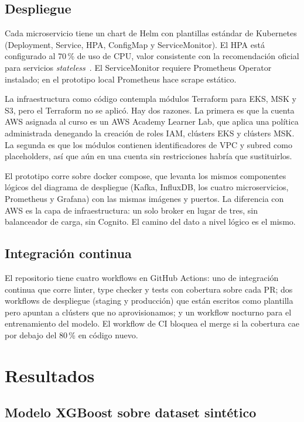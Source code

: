 \documentclass[conference]{IEEEtran}
\begin{document}
\subsection{Despliegue}

Cada microservicio tiene un chart de Helm con plantillas estándar 
de Kubernetes (Deployment, Service, HPA, ConfigMap y 
ServiceMonitor). El HPA está configurado al 70\,\% de uso de CPU, 
valor consistente con la recomendación oficial para servicios 
\emph{stateless}~\cite{kubernetes}. El ServiceMonitor requiere 
Prometheus Operator instalado; en el prototipo local Prometheus 
hace scrape estático.

La infraestructura como código contempla módulos Terraform para 
EKS, MSK y S3, pero el Terraform no se aplicó. Hay dos razones. La 
primera es que la cuenta AWS asignada al curso es un AWS Academy 
Learner Lab, que aplica una política administrada denegando la 
creación de roles IAM, clústers EKS y clústers MSK. La segunda es 
que los módulos contienen identificadores de VPC y subred como 
placeholders, así que aún en una cuenta sin restricciones habría 
que sustituirlos.

El prototipo corre sobre docker compose, que levanta los mismos 
componentes lógicos del diagrama de despliegue (Kafka, InfluxDB, 
los cuatro microservicios, Prometheus y Grafana) con las mismas 
imágenes y puertos. La diferencia con AWS es la capa de 
infraestructura: un solo broker en lugar de tres, sin balanceador 
de carga, sin Cognito. El camino del dato a nivel lógico es el 
mismo.

\subsection{Integración continua}

El repositorio tiene cuatro workflows en GitHub Actions: uno de 
integración continua que corre linter, type checker y tests con 
cobertura sobre cada PR; dos workflows de despliegue (staging y 
producción) que están escritos como plantilla pero apuntan a 
clústers que no aprovisionamos; y un workflow nocturno para el 
entrenamiento del modelo. El workflow de CI bloquea el merge si la 
cobertura cae por debajo del 80\,\% en código nuevo.

\FloatBarrier
\section{Resultados}\label{sec:resultados}

\subsection{Modelo XGBoost sobre dataset sintético}
\end{document}
